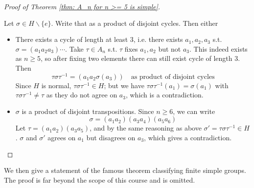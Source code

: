 \documentclass{article}
\begin{document}
\begin{proof}[Proof of Theorem \ref{thm: A_n for n >= 5 is simple}]
\begin{itemize}
\begin{itemize}
            Let $\sigma \in H \smallsetminus \{e\}$. Write that as a product of disjoint cycles. Then either
            \begin{itemize}
                \item There exists a cycle of length at least 3, i.e. there exists $a_1, a_2, a_3$ s.t. $\sigma = (a_1 a_2 a_3) \cdots$. Take $\tau \in A_n$ s.t. $\tau$ fixes $a_1, a_2$ but not $a_3$. This indeed exists as $n \geq 5$, so after fixing two elements there can still exist cycle of length 3. Then
                \[
                    \tau \sigma \tau^{-1} = (a_1 a_2 \sigma(a_3)) \quad \text{as product of disjoint cycles}
                \]
                Since $H$ is normal, $\tau \sigma \tau^{-1} \in H$; but we have $\tau \sigma \tau^{-1}(a_1) = \sigma(a_1)$ with $\tau \sigma \tau^{-1} \neq \tau$ as they do not agree on $a_3$, which is a contradiction.
                \item $\sigma$ is a product of disjoint transpositions. Since $n \geq 6$, we can write
                \[
                    \sigma = (a_1 a_2)(a_3 a_4)(a_5 a_6)
                \]
                Let $\tau = (a_1 a_2)(a_3 a_5)$, and by the same reasoning as above $\sigma' = \tau \sigma \tau^{-1} \in H$. $\sigma$ and $\sigma'$ agrees on $a_1$ but disagrees on $a_3$, which gives a contradiction.
            \end{itemize}
        \end{itemize}
    \end{itemize}
\end{proof}

\textstart
We then give a statement of the famous theorem classifying finite simple groups. The proof is far beyond the scope of this course and is omitted.
\end{document}
